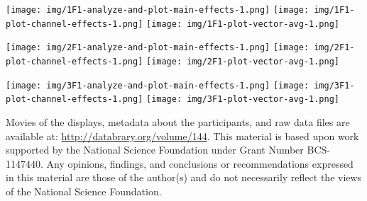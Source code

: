 \documentclass[landscape,final,paperwidth=72in,paperheight=41.5in,fontscale=0.285]{baposter}
\begin{document}
\begin{poster}
{
\begin{center}
  \texttt{[image: img/1F1-analyze-and-plot-main-effects-1.png]}
  \hfill
  \texttt{[image: img/1F1-plot-channel-effects-1.png]}
  \hfill
  \texttt{[image: img/1F1-plot-vector-avg-1.png]}
\end{center}
}
{
\begin{center}
  \texttt{[image: img/2F1-analyze-and-plot-main-effects-1.png]}
  \hfill
  \texttt{[image: img/2F1-plot-channel-effects-1.png]}
  \hfill
  \texttt{[image: img/2F1-plot-vector-avg-1.png]}
\end{center}
}
{
\begin{center}
  \texttt{[image: img/3F1-analyze-and-plot-main-effects-1.png]}
  \hfill
  \texttt{[image: img/3F1-plot-channel-effects-1.png]}
  \hfill
  \texttt{[image: img/3F1-plot-vector-avg-1.png]}
\end{center}
}
    {
       Movies of the displays, metadata about the participants, and raw data files are available at: \url{http://databrary.org/volume/144}.
     }  
    {
    \smaller
      This material is based upon work supported by the National Science Foundation under Grant Number BCS-1147440. Any opinions, findings, and conclusions or recommendations expressed in this material are those of the author(s) and do not necessarily reflect the views of the National Science Foundation.  
    }    
  {
          \tiny
          \renewcommand{\refname}{\vspace{-0.5em}} %
          
          

}
\end{poster}%
%
\end{document}
